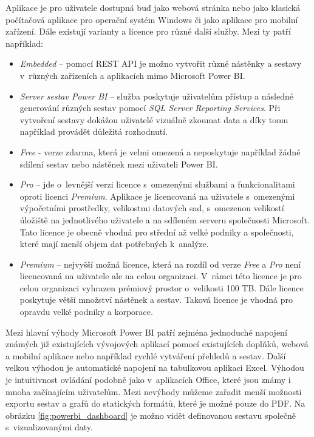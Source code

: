 \documentclass[czech,master]{diploma}
\begin{document}
Aplikace je pro uživatele dostupná buď jako webová stránka nebo jako klasická počítačová aplikace pro operační systém Windows či jako aplikace pro mobilní zařízení. Dále existují varianty a licence pro různé další služby. Mezi ty patří například: \cite{ref:microsoft_bi_general}
\begin{itemize}
\item \textit{Embedded} -- pomocí REST API je možno vytvořit různé nástěnky a sestavy v~různých zařízeních a aplikacích mimo Microsoft Power BI.
\item \textit{Server sestav Power BI} -- služba poskytuje uživatelům přístup a následné generování různých sestav pomocí \textit{SQL Server Reporting Services}. Při vytvoření sestavy dokážou uživatelé vizuálně zkoumat data a díky tomu například provádět důležitá rozhodnutí.
\item \textit{Free} - verze zdarma, která je velmi omezená a neposkytuje například žádné sdílení sestav nebo nástěnek mezi uživateli Power BI.
\item \textit{Pro} -- jde o~levnější verzi licence s~omezenými službami a funkcionalitami oproti licenci \textit{Premium}. Aplikace je licencovaná na uživatele s~omezenými výpočetními prostředky, velikostmi datových sad, s~omezenou velikostí úložiště na jednotlivého uživatele a na sdíleném serveru společnosti Microsoft. Tato licence je obecně vhodná pro střední až velké podniky a společnosti, které mají menší objem dat potřebných k~analýze.
\item \textit{Premium} -- nejvyšší možná licence, která na rozdíl od verze \textit{Free} a \textit{Pro} není licencovaná na uživatele ale na celou organizaci. V~rámci této licence je pro celou organizaci vyhrazen prémiový prostor o~velikosti 100 TB. Dále licence poskytuje větší množství nástěnek a sestav. Taková licence je vhodná pro opravdu velké podniky a korporace.
\end{itemize}

Mezi hlavní výhody Microsoft Power BI patří zejména jednoduché napojení známých již existujících vývojových aplikací pomocí existujících doplňků, webová a mobilní aplikace nebo například rychlé vytváření přehledů a sestav. \cite{ref:microsoft_bi_general} Další velkou výhodou je automatické napojení na tabulkovou aplikaci Excel. Výhodou je intuitivnost ovládání podobně jako v~aplikacích Office, které jsou známy i mnoha začínajícím uživatelům. Mezi nevýhody můžeme zařadit menší možnosti exportu sestav a grafů do statických formátů, které je možné pouze do PDF. Na obrázku \ref{fig:powerbi_dashboard} je možno vidět definovanou sestavu společně s~vizualizovanými daty.
\end{document}
